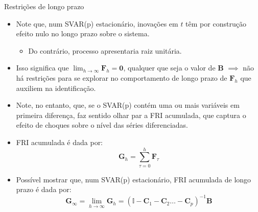 \documentclass[11pt]{beamer}
\begin{document}
\begin{frame}{Restrições de longo prazo}
\begin{itemize}
	\item Note que, num SVAR(p) estacionário, inovações em $t$ têm por construção efeito nulo no longo prazo sobre o sistema.
	\begin{itemize}
		\item Do contrário, processo apresentaria raiz unitária.
	\end{itemize}
	\item Isso significa que $\lim_{h \to \infty} \boldsymbol{F}_h = \boldsymbol{0}$, qualquer que seja o valor de $\boldsymbol{B}$ $\implies$ não há restrições para se explorar no comportamento de longo prazo  de $\boldsymbol{F}_h$ que auxiliem na identificação.
	\item Note, no entanto, que, se o SVAR(p) contém uma ou mais variáveis em {\color{blue}primeira diferença}, faz sentido olhar par a {\color{blue}FRI acumulada}, que captura o efeito de choques sobre {\color{blue}o nível das séries diferenciadas}.
		\item FRI acumulada é dada por:
		$$\boldsymbol{G}_h = \sum_{\tau = 0}^h \boldsymbol{F}_\tau$$
\item Possível mostrar que, num SVAR(p) estacionário, FRI acumulada de longo prazo é dada por:
$$\boldsymbol{G}_\infty = \lim_{h \to \infty}\boldsymbol{G}_h = (\mathbb{I} - \boldsymbol{C}_1 - \boldsymbol{C}_2 \ldots - \boldsymbol{C}_p)^{-1} \boldsymbol{B}$$
\end{itemize}
\end{frame}
\end{document}
